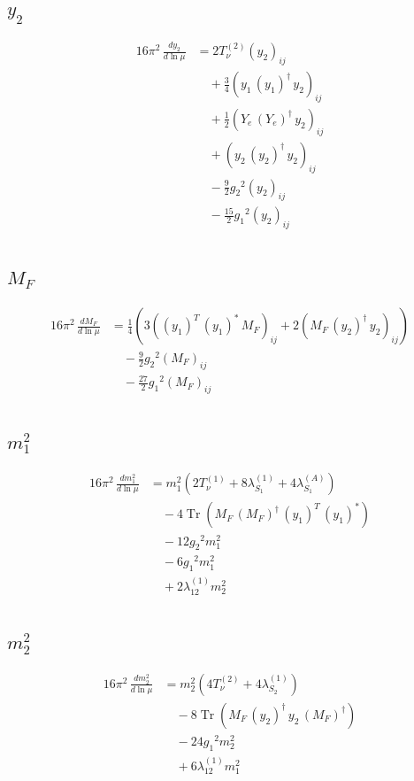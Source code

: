 \documentclass[10pt,a4paper]{article}
\begin{document}
\subsection*{$y_2$}
\begin{align*}
16\pi^2\,\frac{d y_2}{d\ln\mu} &=2 T_{\nu}^{(2)} \left({y_2}\right)_{ij} \\
&\quad +\frac{3}{4} \left({y_1}\,\left({y_1}\right)^{\dagger}\,{y_2}\right)_{ij} \\
&\quad +\frac{1}{2} \left({Y_e}\,\left({Y_e}\right)^{\dagger}\,{y_2}\right)_{ij} \\
&\quad +\left({y_2}\,\left({y_2}\right)^{\dagger}\,{y_2}\right)_{ij} \\
&\quad -\frac{9}{2} {g_2}^2 \left({y_2}\right)_{ij} \\
&\quad -\frac{15}{2} {g_1}^2 \left({y_2}\right)_{ij} \\
\end{align*}
\subsection*{$M_F$}
\begin{align*}
16\pi^2\,\frac{d M_F}{d\ln\mu} &=\frac{1}{4} (3 \left(\left({y_1}\right)^{T}\,\left({y_1}\right)^{*}\,{M_F}\right)_{ij}+2 \left({M_F}\,\left({y_2}\right)^{\dagger}\,{y_2}\right)_{ij}) \\
&\quad -\frac{9}{2} {g_2}^2 \left({M_F}\right)_{ij} \\
&\quad -\frac{27}{2} {g_1}^2 \left({M_F}\right)_{ij} \\
\end{align*}
\subsection*{$m_1^2$}
\begin{align*}
16\pi^2\,\frac{d m_1^2}{d\ln\mu} &={m_1^2} (2 T_{\nu}^{(1)}+8 {\lambda_{S_1}^{(1)}}+4 {\lambda_{S_1}^{(A)}}) \\
&\quad -4 \operatorname{Tr}\!\left({M_F}\,\left({M_F}\right)^{\dagger}\,\left({y_1}\right)^{T}\,\left({y_1}\right)^{*}\right) \\
&\quad -12 {g_2}^2 {m_1^2} \\
&\quad -6 {g_1}^2 {m_1^2} \\
&\quad +2 {\lambda_{12}^{(1)}} {m_2^2} \\
\end{align*}
\subsection*{$m_2^2$}
\begin{align*}
16\pi^2\,\frac{d m_2^2}{d\ln\mu} &={m_2^2} (4 T_{\nu}^{(2)}+4 {\lambda_{S_2}^{(1)}}) \\
&\quad -8 \operatorname{Tr}\!\left({M_F}\,\left({y_2}\right)^{\dagger}\,{y_2}\,\left({M_F}\right)^{\dagger}\right) \\
&\quad -24 {g_1}^2 {m_2^2} \\
&\quad +6 {\lambda_{12}^{(1)}} {m_1^2} \\
\end{align*}
\end{document}
